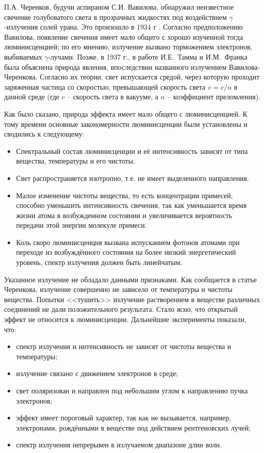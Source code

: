 \documentclass[12pt,a4paper]{report} %
\begin{document}
П.А. Черенков, будучи аспираном С.И. Вавилова, обнаружил неизвестное свечение голубоватого света в прозрачных жидкостях под воздействием $\gamma$-излучения солей урана. Это произошло в 1934 г \cite{Cerenkov}. Согласно предположению Вавилова, появление свечения имеет мало общего с хорошо изученной тогда люминисценцией; по его мнению, излучение вызвано торможением электронов, выбиваемых $\gamma$-лучами. Позже, в 1937 г., в работе И.Е.~Тамма и И.М.~Франка \cite{Tamm} была объяснена природа явления,  впоследствии названного излучением Вавилова-Черенкова. Согласно их теории, свет испускается средой, через которую проходит заряженная частица со скоростью, превышающей скорость света $v = c / n$ в данной среде (где $c$ -- скорость света в вакууме, а $n$ -- коэффициент преломления). 

Как было сказано, природа эффекта имеет мало общего с люминисценцией. К тому времени основные закономерности люминисценции были установлены и сводились к следующему:
\begin{itemize}
    \item Спектральный состав люминисценции и её интенсивность зависят от типа вещества, температуры и его чистоты.
    \item Свет распространяется изотропно, т.е. не имеет выделенного направления.
    \item Малое изменение чистоты вещества, то есть концентрации примесей, способно уменьшить интенсивность свечения, так как уменьшается время жизни атома в возбужденном состоянии и увеличивается вероятность передачи этой энергии молекуле примеси.
    \item Коль скоро люминисценция вызвана испусканием фотонов атомами при переходе из возбуждённого состояния на более низкий энергетический уровень, спектр излучения должен быть линейчатым.
\end{itemize}

Указанное излучение не обладало данными признаками. Как сообщается в статье Черенкова, излучение совершенно не зависело от температуры и чистоты вещества. Попытки <<тушить>> излучение растворением в веществе различных соединений не дали положительного результата. Стало ясно, что открытый эффект не относится к люминисценции. Дальнейшие эксперименты показали, что:
\begin{itemize}
    \item спектр излучения и интенсивность не зависят от чистоты вещества и температуры;
    \item излучение связано с движением электронов в среде;
    \item свет поляризован и направлен под небольшим углом к направлению пучка электронов;
    \item эффект имеет пороговый характер, так как не вызывается, например, электронами, рождёнными в веществе под действием рентгеновских лучей;
    \item спектр излучения непрерывен в излучаемом диапазоне длин волн.
\end{itemize}
\end{document}
